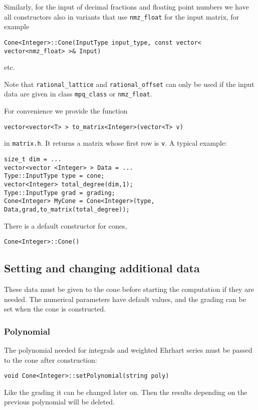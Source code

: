 \documentclass[12pt,a4paper]{scrartcl}
\theoremstyle{definition}
\begin{document}
\begin{small}
Similarly, for the input of decimal fractions and floating point numbers we have all constructors also in variants that use \verb|nmz_float| for the input matrix, for example
\begin{Verbatim}
Cone<Integer>::Cone(InputType input_type, const vector< vector<nmz_float> >& Input)
\end{Verbatim}
etc.

Note that \verb|rational_lattice| and \verb|rational_offset| can only be used if the input data are given in class \verb|mpq_class| or \verb|nmz_float|.

For convenience we provide the function
\begin{Verbatim}
vector<vector<T> > to_matrix<Integer>(vector<T> v)
\end{Verbatim}
in \verb|matrix.h|. It returns a matrix whose first row is \verb|v|. A typical example:
\begin{Verbatim}
size_t dim = ...
vector<vector <Integer> > Data = ...
Type::InputType type = cone;
vector<Integer> total_degree(dim,1);
Type::InputType grad = grading;
Cone<Integer> MyCone = Cone<Integer>(type, Data,grad,to_matrix(total_degree));
\end{Verbatim}

There is a default constructor for cones,
\begin{Verbatim}
Cone<Integer>::Cone()
\end{Verbatim}

\subsection{Setting and changing additional data}

These data must be given to the cone before starting the computation if they are needed. 
The numerical parameters have default values, and the grading can be set when the cone is constructed.

\subsubsection{Polynomial}

The polynomial needed for integrals and weighted Ehrhart series must be passed to the cone after construction:
\begin{Verbatim}
void Cone<Integer>::setPolynomial(string poly)
\end{Verbatim}

Like the grading it can be changed later on. Then the results depending on the previous polynomial will be deleted.


\end{small}
\end{document}
